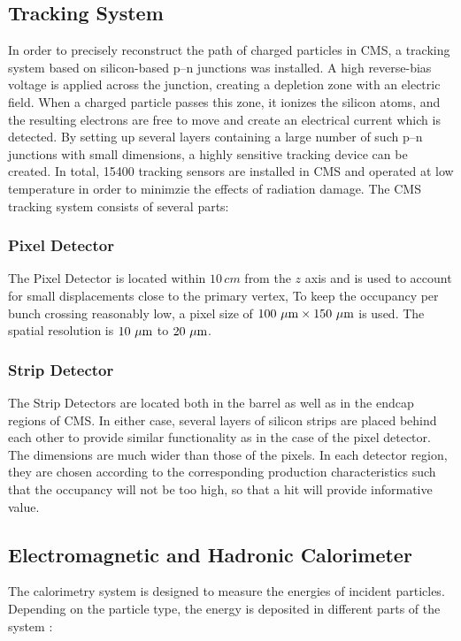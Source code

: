 \subsection{Tracking System}
In order to precisely reconstruct the path of charged particles in CMS, a tracking system based on silicon-based p--n junctions was installed. A high reverse-bias voltage is applied across the junction, creating a depletion zone with an electric field. When a charged particle passes this zone, it ionizes the silicon atoms, and the resulting electrons are free to move and create an electrical current which is detected. By setting up several layers containing a large number of such p--n junctions with small dimensions, a highly sensitive tracking device can be created. In total, 15400 tracking sensors are installed in CMS and operated at low temperature in order to minimzie the effects of radiation damage. The CMS tracking system consists of several parts:

\subsubsection*{Pixel Detector}
The Pixel Detector is located within $10\,\unit{cm}$ from the $z$ axis and is used to account for small displacements close to the primary vertex, To keep the occupancy per bunch crossing reasonably low, a pixel size of $100\,\,\mu\text{m} \times 150\,\,\mu\text{m}$ is used. The spatial resolution is $10\,\,\mu\text{m}$ to $20\,\,\mu\text{m}$.

\subsubsection*{Strip Detector}
The Strip Detectors are located both in the barrel as well as in the endcap regions of CMS. In either case, several layers of silicon strips are placed behind each other to provide similar functionality as in the case of the pixel detector. The dimensions are much wider than those of the pixels. In each detector region, they are chosen according to the corresponding production characteristics such that the occupancy will not be too high, so that a hit will provide informative value.

\subsection{Electromagnetic and Hadronic Calorimeter}
The calorimetry system is designed to measure the energies of incident particles. Depending on the particle type, the energy is deposited in different parts of the system \cite{Halkiadakis:2010mj}:

